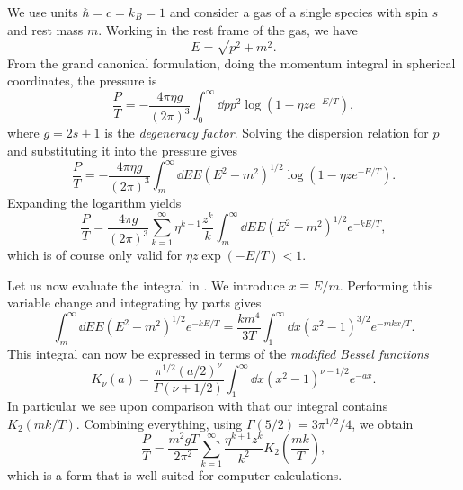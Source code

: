 We use units $\hbar=c=k_B=1$ and consider a gas of a single species
with spin $s$ and rest mass $m$. Working in the rest frame of the gas,
we have
\begin{equation}\label{eq:dispersion}
  E=\sqrt{p^2+m^2}.  
\end{equation}
From the grand canonical formulation,
doing the momentum integral in spherical coordinates, the pressure is
\begin{equation}
  \frac{P}{T}=-\frac{4\pi\eta g}{(2\pi)^3}\int_0^\infty 
      \dd{p}p^2\log\left(1-\eta z e^{-E/T}\right),
\end{equation}
where $g=2s+1$ is the {\it degeneracy factor}. 
Solving the dispersion relation
for $p$ and substituting it into the pressure gives
\begin{equation}
  \frac{P}{T}=-\frac{4\pi\eta g}{(2\pi)^3}\int_m^\infty 
      \dd{E}E\left(E^2-m^2\right)^{1/2}\log\left(1-\eta z e^{-E/T}\right).
\end{equation}
Expanding the logarithm yields
\begin{equation}\label{eq:pressE}
  \frac{P}{T}=\frac{4\pi g}{(2\pi)^3}\sum_{k=1}^\infty\eta^{k+1}\frac{z^k}{k}\int_m^\infty 
      \dd{E}E\left(E^2-m^2\right)^{1/2}e^{-kE/T},
\end{equation}
which is of course only valid for $\eta z\exp(-E/T)<1$.

Let us now evaluate the integral in . We introduce
$x\equiv E/m$. Performing this variable change and integrating by parts gives
\begin{equation}\label{eq:pressint}
  \int_m^\infty\dd{E}E\left(E^2-m^2\right)^{1/2}e^{-kE/T}
  =\frac{km^4}{3T}\int_1^\infty\dd x\left(x^2-1\right)^{3/2}e^{-mkx/T}.
\end{equation}
This integral can now be expressed in terms of the
{\it modified Bessel functions}
\begin{equation}
  K_\nu(a)=\frac{\pi^{1/2}(a/2)^\nu}{\Gamma(\nu+1/2)}
             \int_1^\infty\dd x(x^2-1)^{\nu-1/2}e^{-ax}.
\end{equation}
In particular we see upon comparison with 
that our integral contains $K_2(mk/T)$. Combining everything,
using $\Gamma(5/2)=3\pi^{1/2}/4$, we obtain
\begin{equation}\label{eq:pressrelQM}
  \frac{P}{T}=\frac{m^2gT}{2\pi^2}\sum_{k=1}^\infty\frac{\eta^{k+1}z^k}{k^2}
                         K_2\left(\frac{mk}{T}\right),
\end{equation}
which is a form that is well suited for computer calculations.

